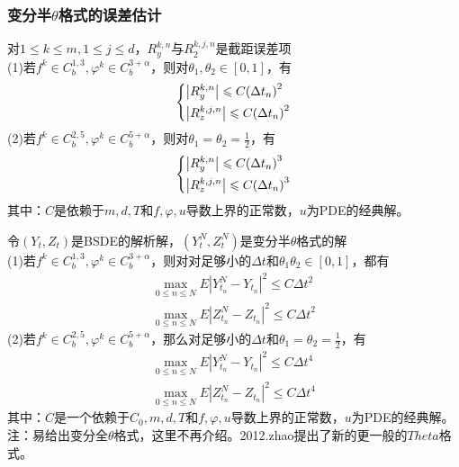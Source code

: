 		\subsubsection{变分半$\theta$格式的误差估计}
			对$1 \leqslant k \leqslant m,1 \leqslant j \leqslant d$，$R_y^{k,n}$与$R_2^{k,j,n}$是截距误差项\\
			\noindent (1)若$f^{k} \in C_b^{1,3},{\varphi}^k \in C_b^{3+\alpha}$，则对$\theta_1,\theta_2 \in [0,1]$，有
					\begin{equation*}
						\centering
					\left\{\begin{lgathered}
					{\left| {R_y^{k,n}} \right| \leqslant C{{\left( {\Delta {t_n}} \right)}^2}}\\
					{\left| {R_z^{k,j,n}} \right| \leqslant C{{\left( {\Delta {t_n}} \right)}^2}}
					\end{lgathered} \right.
					\end{equation*}
			\noindent (2)若$f^{k} \in C_b^{2,5},{\varphi}^k  \in C_b^{5+\alpha}$，则对$\theta_1=\theta_2 =\frac 12$，有
					\begin{equation*}
						\centering
					\left\{\begin{lgathered}
					{\left| {R_y^{k,n}} \right| \leqslant C{{\left( {\Delta {t_n}} \right)}^3}}\\
					{\left| {R_z^{k,j,n}} \right| \leqslant C{{\left( {\Delta {t_n}} \right)}^3}}
					\end{lgathered} \right.
					\end{equation*}
			 其中：$C$是依赖于$m,d,T$和$f,\varphi,u$导数上界的正常数，$u$为PDE的经典解。
			 \par
			 令$(Y_t,Z_t)$是BSDE的解析解，$(Y_t^N,Z_t^N)$是变分半$\theta$格式的解\\
			 \noindent (1)若$f^{k} \in C_b^{1,3},{\varphi}^k \in C_b^{3+\alpha}$，则对对足够小的$\Delta {t}$和$ \theta_1 \theta_2\in [0,1]$，都有
			\begin{align*}
			\mathop {\max }\limits_{0 \leqslant n \leqslant N}E{|Y_{t_n}^N-Y_{t_n}|}^2 \leqslant C{\Delta {t}}^2 \\
			\mathop {\max }\limits_{0 \leqslant n \leqslant N}E{|Z_{t_n}^N-Z_{t_n}|}^2 \leqslant C{\Delta {t}}^2 \end{align*}
			 \noindent (2)若$f^{k} \in C_b^{2,5},{\varphi}^k\in C_b^{5+\alpha}$，那么对足够小的$\Delta {t}$和$\theta_1=\theta_2=\frac 12$，有
			\begin{align*}
			\mathop {\max }\limits_{0 \leqslant n \leqslant N}E{|Y_{t_n}^N-Y_{t_n}|}^2 \leqslant C{\Delta {t}}^4 \\
			\mathop {\max }\limits_{0 \leqslant n \leqslant N}E{|Z_{t_n}^N-Z_{t_n}|}^2 \leqslant C{\Delta {t}}^4
			\end{align*}
			 其中：$C$是一个依赖于$C_0,m,d,T$和$f,\varphi,u$导数上界的正常数，$u$为PDE的经典解。\\
			注：易给出变分全$\theta$格式，这里不再介绍。2012.zhao\cite{2012.zhao}提出了新的更一般的$Theta$格式。

